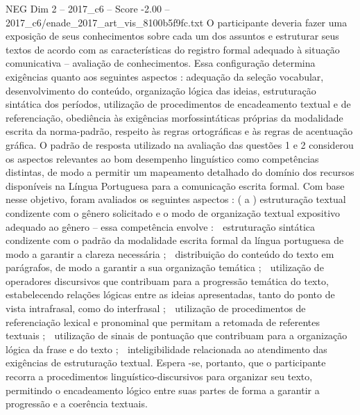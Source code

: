 \begin{textsample}{NEG Dim 2 – 2017\_c6 – Score -2.00 – 2017\_c6/enade\_2017\_art\_vis\_8100b5f9fc.txt}
O participante deveria fazer uma exposição de seus conhecimentos sobre cada um dos assuntos e estruturar seus textos de acordo com as características do registro formal adequado à situação comunicativa – avaliação de conhecimentos.
Essa configuração determina exigências quanto aos seguintes aspectos : adequação da seleção vocabular, desenvolvimento do conteúdo, organização lógica das ideias, estruturação sintática dos períodos, utilização de procedimentos de encadeamento textual e de referenciação, obediência às exigências morfossintáticas próprias da modalidade escrita da norma-padrão, respeito às regras ortográficas e às regras de acentuação gráfica.
O padrão de resposta utilizado na avaliação das questões 1 e 2 considerou os aspectos relevantes ao bom desempenho linguístico como competências distintas, de modo a permitir um mapeamento detalhado do domínio dos recursos disponíveis na Língua Portuguesa para a comunicação escrita formal.
Com base nesse objetivo, foram avaliados os seguintes aspectos : ( a ) estruturação textual condizente com o gênero solicitado e o modo de organização textual expositivo adequado ao gênero – essa competência envolve :  estruturação sintática condizente com o padrão da modalidade escrita formal da língua portuguesa de modo a garantir a clareza necessária ;  distribuição do conteúdo do texto em parágrafos, de modo a garantir a sua organização temática ;  utilização de operadores discursivos que contribuam para a progressão temática do texto, estabelecendo relações lógicas entre as ideias apresentadas, tanto do ponto de vista intrafrasal, como do interfrasal ;  utilização de procedimentos de referenciação lexical e pronominal que permitam a retomada de referentes textuais ;  utilização de sinais de pontuação que contribuam para a organização lógica da frase e do texto ;  inteligibilidade relacionada ao atendimento das exigências de estruturação textual.
Espera -se, portanto, que o participante recorra a procedimentos linguístico-discursivos para organizar seu texto, permitindo o encadeamento lógico entre suas partes de forma a garantir a progressão e a coerência textuais.

\end{textsample}
